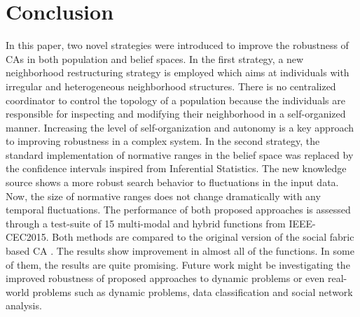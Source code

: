 \documentclass[letterpaper]{article}
\begin{document}
\section{Conclusion}
In this paper, two novel strategies were introduced to improve the robustness of CAs in both population and belief spaces. In the first strategy, a new neighborhood restructuring strategy is employed which aims at individuals with irregular and heterogeneous neighborhood structures. There is no centralized coordinator to control the topology of a population because the individuals are responsible for inspecting and modifying their neighborhood in a self-organized manner. Increasing the level of self-organization and autonomy is a key approach to improving robustness in a complex system.  In the second strategy, the standard implementation of normative ranges in the belief space was replaced by the confidence intervals inspired from Inferential Statistics. The new knowledge source shows a more robust search behavior to fluctuations in the input data. Now, the size of normative ranges does not change dramatically with any temporal fluctuations.\newline
The performance of both proposed approaches is assessed through a test-suite of 15 multi-modal and hybrid functions from IEEE-CEC2015. Both methods are compared to the original version of the social fabric based CA \cite{ali2016leveraged}. The results show improvement in almost all of the functions. In some of them, the results are quite promising. Future work might be investigating the improved robustness of proposed approaches to dynamic problems or even real-world problems such as dynamic problems, data classification and social network analysis.


\end{document}
